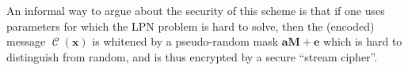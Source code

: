 \documentclass[11pt,a4paper]{article}
\theoremstyle{definition}
\DeclareMathOperator\code{\mathcal{C}}
\begin{document}
An informal way to argue about the security of this scheme is that if one uses parameters for which the LPN problem is hard to solve, then the (encoded) message $\code(\bm{x})$ is whitened
by a pseudo-random mask $\bm{a}\bm{M} + \bm{e}$ which is hard to distinguish from random, and is thus encrypted by a secure ``stream cipher''.












\end{document}
